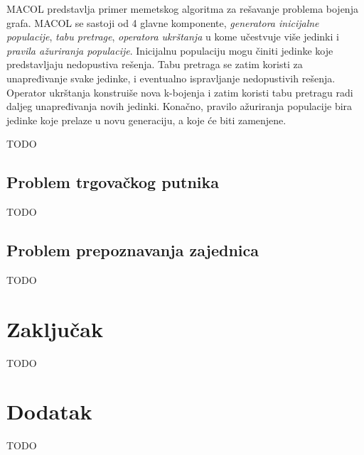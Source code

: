 \documentclass[a4paper]{article}
\begin{document}
MACOL \cite{lu2010memetic} predstavlja primer memetskog algoritma za rešavanje problema bojenja grafa. MACOL se sastoji od 4 glavne komponente, \textit{generatora inicijalne populacije}, \textit{tabu pretrage}, \textit{operatora ukrštanja} u kome učestvuje više jedinki i \textit{pravila ažuriranja populacije}. Inicijalnu populaciju mogu činiti jedinke koje predstavljaju nedopustiva rešenja. Tabu pretraga \cite{tabu_pretraga_miskovic} se zatim koristi za unapređivanje svake jedinke, i eventualno ispravljanje nedopustivih rešenja. Operator ukrštanja konstruiše nova k-bojenja i zatim koristi tabu pretragu radi daljeg unapređivanja novih jedinki. Konačno, pravilo ažuriranja populacije bira jedinke koje prelaze u novu generaciju, a koje će biti zamenjene.

TODO



\subsection{Problem trgovačkog putnika}
\label{sec:trgovacki_putnik}

TODO
















\subsection{Problem prepoznavanja zajednica}
\label{sec:prepoznavanje_zajednica}

TODO












\section{Zaključak}
\label{sec:zakljucak}

TODO

\appendix
 


\appendix
\section{Dodatak}
TODO
\end{document}
